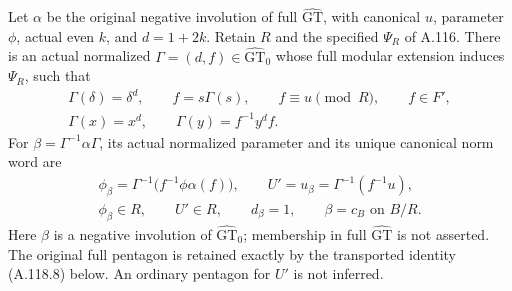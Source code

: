 Let \(\alpha\) be the original negative involution of full
\(\widehat{\mathrm{GT}}\), with canonical \(u\), parameter \(\phi\),
actual even \(k\), and \(d=1+2k\). Retain \(R\) and the specified
\(\Psi_R\) of A.116. There is an actual normalized
\(\Gamma=(d,f)\in\widehat{\mathrm{GT}}_0\) whose full modular
extension induces \(\Psi_R\), such that
\[
 \begin{gathered}
 \Gamma(\delta)=\delta^d,\qquad f=s\Gamma(s),\qquad
 f\equiv u\pmod R,\qquad f\in F',\\
 \Gamma(x)=x^d,\qquad \Gamma(y)=f^{-1}y^df.
 \end{gathered}                                                   \tag{A.118.1}
\]
For \(\beta=\Gamma^{-1}\alpha\Gamma\), its actual normalized
parameter and its unique canonical norm word are
\[
 \begin{gathered}
 \phi_\beta=\Gamma^{-1}\bigl(f^{-1}\phi\alpha(f)\bigr),\qquad
 U'=u_\beta=\Gamma^{-1}(f^{-1}u),\\
 \phi_\beta\in R,\qquad U'\in R,\qquad
 d_\beta=1,\qquad \beta=c_B\text{ on }B/R.
 \end{gathered}                                                   \tag{A.118.2}
\]
Here \(\beta\) is a negative involution of
\(\widehat{\mathrm{GT}}_0\); membership in full
\(\widehat{\mathrm{GT}}\) is not asserted.
The original full pentagon is retained exactly by the transported
identity (A.118.8) below. An ordinary pentagon for \(U'\) is not
inferred.

